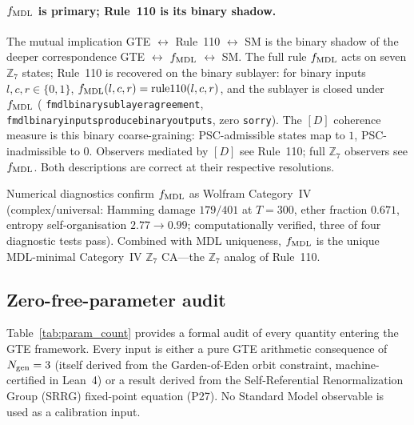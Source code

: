 \documentclass[11pt]{article}
\theoremstyle{remark}
\newcommand{\ZS}{\mathbb{Z}_7}
\newcommand{\Ngen}{N_{\rm gen}}
\newcommand{\fmdl}{f_{\rm MDL}}
\newcommand{\lean}[1]{%
  \penalty-100
  \begingroup\def\_{\textunderscore\allowbreak}\texttt{#1}\endgroup}
\begin{document}
\paragraph{$\fmdl$ is primary; Rule~110 is its binary shadow.}
The mutual implication GTE $\leftrightarrow$ Rule~110 $\leftrightarrow$ SM is the
binary shadow of the deeper correspondence GTE $\leftrightarrow$ $\fmdl$ $\leftrightarrow$ SM.
The full rule $\fmdl$ acts on seven $\ZS$ states; Rule~110 is recovered on the
binary sublayer: for binary inputs $l,c,r \in \{0,1\}$,
$\fmdl(l,c,r) = \text{rule110}(l,c,r)$, and the sublayer is closed under $\fmdl$
(\lean{fmdl\_binary\_sublayer\allowbreak\_agreement},
\lean{fmdl\_binary\_inputs\allowbreak\_produce\_binary\_outputs}, zero \texttt{sorry}).
The $[D]$ coherence measure is this binary coarse-graining: PSC-admissible states
map to $1$, PSC-inadmissible to $0$.
Observers mediated by $[D]$ see Rule~110; full $\ZS$ observers see $\fmdl$.
Both descriptions are correct at their respective resolutions.

Numerical diagnostics confirm $\fmdl$ as Wolfram Category~IV
(complex/universal: Hamming damage $179/401$ at $T=300$, ether fraction $0.671$,
entropy self-organisation $2.77 \to 0.99$; computationally verified, three of four
diagnostic tests pass).
Combined with MDL uniqueness, $\fmdl$ is the unique MDL-minimal Category~IV
$\ZS$ CA---the $\ZS$ analog of Rule~110.

\subsection{Zero-free-parameter audit}
\label{sec:param_audit}

Table~\ref{tab:param_count} provides a formal audit of every quantity
entering the GTE framework.  Every input is either a pure
GTE arithmetic consequence of $\Ngen = 3$ (itself derived from
the Garden-of-Eden orbit constraint, machine-certified in Lean~4) or a
result derived from the Self-Referential Renormalization Group (SRRG) fixed-point equation (P27).
No Standard Model observable is used as a calibration input.
\end{document}
